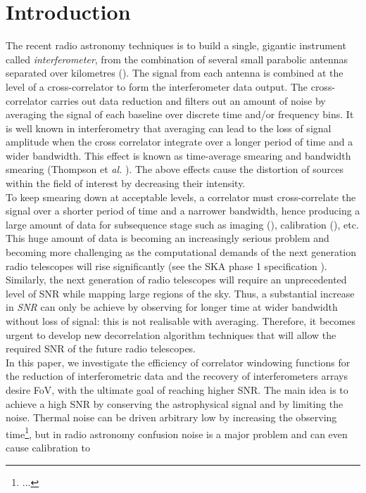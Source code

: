 \documentclass[useAMS,usenatbib]{mn2e}
\begin{document}
\section[]{Introduction}
The recent radio astronomy techniques is to build a single, gigantic instrument called \textit{interferometer}, from the combination of 
several small parabolic antennas separated over kilometres (\cite{2}). The signal from each antenna is combined at the level of a 
cross-correlator to form the interferometer  data output. The cross-correlator carries out  data reduction and filters out an amount of 
noise by averaging the signal of each baseline over discrete time and/or frequency bins.
It is well known in interferometry that averaging 
can lead to the loss of signal amplitude when the cross correlator integrate over a longer period of time and a wider bandwidth. This 
effect is known as time-average smearing and bandwidth smearing (Thompson et \textit{al.} \cite{2}). The above effects cause the distortion 
of sources within the 
field of interest by decreasing their intensity.\\
To keep smearing down at acceptable levels, a correlator must cross-correlate the signal over a shorter period of time and a narrower 
bandwidth, hence producing a large amount of data for subsequence stage such as 
imaging (\cite{2}), calibration (\cite{2}), etc. This huge amount of data is becoming an increasingly serious problem 
and becoming 
more challenging as the computational demands of the next generation radio telescopes will rise significantly (see the SKA phase 1 
specification \cite{2}). 
Similarly, the next generation of radio telescopes will require an unprecedented level of SNR while mapping large regions of the sky. Thus, 
a substantial 
increase in \textit{SNR} can only be achieve by observing for longer time at wider bandwidth without loss of signal: this is not 
realisable with averaging.
Therefore, it becomes urgent to develop new decorrelation algorithm techniques that will allow the required SNR of the future radio 
telescopes.\\
In this paper, we investigate the efficiency of correlator windowing functions for the reduction of 
interferometric data and the recovery of interferometers arrays desire FoV, with the ultimate goal of reaching higher SNR. The main idea is 
to achieve a high SNR by conserving the astrophysical signal and by limiting the noise. Thermal noise can be driven arbitrary low by 
increasing the observing time\footnote{...}, but in radio astronomy confusion noise is a major problem and can even cause calibration to 
\end{document}
